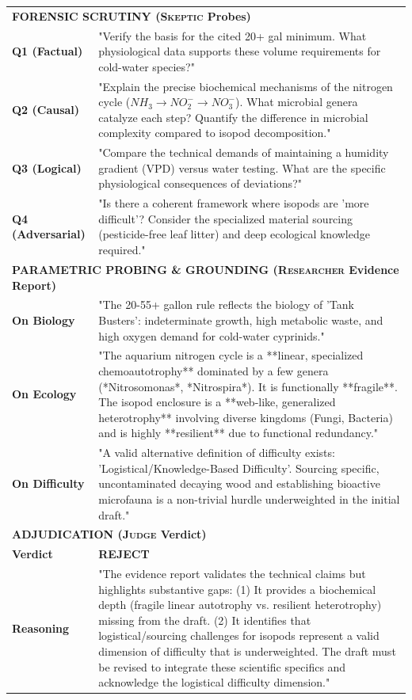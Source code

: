 \documentclass{article}
\begin{document}
\begin{longtable}{p{} p{}}
\multicolumn{2}{l}{\textbf{FORENSIC SCRUTINY (\textsc{Skeptic} Probes)}} \\
\textbf{Q1 (Factual)} & "Verify the basis for the cited 20+ gal minimum. What physiological data supports these volume requirements for cold-water species?" \\
\textbf{Q2 (Causal)} & "Explain the precise biochemical mechanisms of the nitrogen cycle ($NH_3 \rightarrow NO_2^- \rightarrow NO_3^-$). What microbial genera catalyze each step? Quantify the difference in microbial complexity compared to isopod decomposition." \\
\textbf{Q3 (Logical)} & "Compare the technical demands of maintaining a humidity gradient (VPD) versus water testing. What are the specific physiological consequences of deviations?" \\
\textbf{Q4 (Adversarial)} & "Is there a coherent framework where isopods are 'more difficult'? Consider the specialized material sourcing (pesticide-free leaf litter) and deep ecological knowledge required." \\
\midrule

\multicolumn{2}{l}{\textbf{PARAMETRIC PROBING \& GROUNDING (\textsc{Researcher} Evidence Report)}} \\
\textbf{On Biology} & "The 20-55+ gallon rule reflects the biology of 'Tank Busters': indeterminate growth, high metabolic waste, and high oxygen demand for cold-water cyprinids." \\
\textbf{On Ecology} & "The aquarium nitrogen cycle is a **linear, specialized chemoautotrophy** dominated by a few genera (*Nitrosomonas*, *Nitrospira*). It is functionally **fragile**. The isopod enclosure is a **web-like, generalized heterotrophy** involving diverse kingdoms (Fungi, Bacteria) and is highly **resilient** due to functional redundancy." \\
\textbf{On Difficulty} & "A valid alternative definition of difficulty exists: 'Logistical/Knowledge-Based Difficulty'. Sourcing specific, uncontaminated decaying wood and establishing bioactive microfauna is a non-trivial hurdle underweighted in the initial draft." \\
\midrule

\multicolumn{2}{l}{\textbf{ADJUDICATION (\textsc{Judge} Verdict)}} \\
\textbf{Verdict} & \textbf{\textsc{REJECT}} \\
\textbf{Reasoning} & "The evidence report validates the technical claims but highlights substantive gaps: (1) It provides a biochemical depth (fragile linear autotrophy vs. resilient heterotrophy) missing from the draft. (2) It identifies that logistical/sourcing challenges for isopods represent a valid dimension of difficulty that is underweighted. The draft must be revised to integrate these scientific specifics and acknowledge the logistical difficulty dimension." \\
\midrule


\end{longtable}
\end{document}
